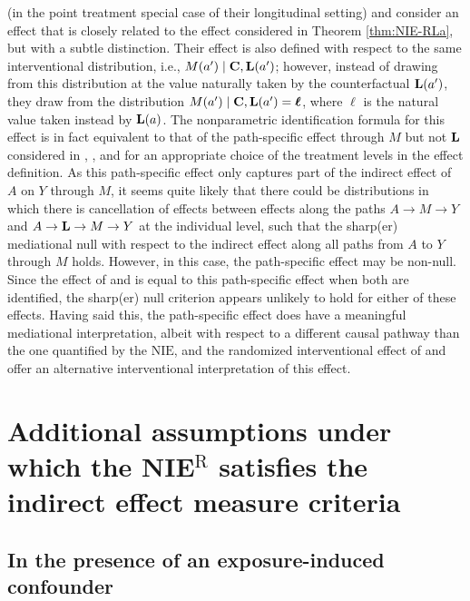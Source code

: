 \documentclass[12pt]{article}
\begin{document}
\cite{zheng2017longitudinal} (in the point treatment special case of their longitudinal setting) and \cite{nguyen2022clarifying} consider an effect that is closely related to the effect considered in Theorem \ref{thm:NIE-RLa}, but with a subtle distinction.  Their effect is also defined with respect to the same interventional distribution, i.e., $M(a')\mid {\bf C, L}(a')$; however, instead of drawing from this distribution at the value naturally taken by the counterfactual ${\bf L}(a')$, they draw from the distribution $M(a')\mid {\bf C, L}(a')=\boldsymbol{\ell}$, where $\boldsymbol\ell$ is the natural value taken instead by ${\bf L}(a)$. The nonparametric identification formula for this effect is in fact equivalent to that of the path-specific effect through $M$ but not $\bf L$ considered in \cite{avin2005identifiability}, \cite{miles2017quantifying}, and \cite{miles2020semiparametric} for an appropriate choice of the treatment levels in the effect definition. As this path-specific effect only captures part of the indirect effect of $A$ on $Y$ through $M$, it seems quite likely that there could be distributions in which there is cancellation of effects between effects along the paths $A\rightarrow M\rightarrow Y$ and $A\rightarrow {\bf L} \rightarrow M\rightarrow Y$ at the individual level, such that the sharp(er) mediational null with respect to the indirect effect along all paths from $A$ to $Y$ through $M$ holds. However, in this case, the path-specific effect may be non-null. Since the effect of \cite{zheng2017longitudinal} and \cite{nguyen2022clarifying} is equal to this path-specific effect when both are identified, the sharp(er) null criterion appears unlikely to hold for either of these effects. Having said this, the path-specific effect does have a meaningful mediational interpretation, albeit with respect to a different causal pathway than the one quantified by the $\text{NIE}$, and the randomized interventional effect of \cite{zheng2017longitudinal} and \cite{nguyen2022clarifying} offer an alternative interventional interpretation of this effect.

\section{Additional assumptions under which the NIE$^{\text{R}}$ satisfies the indirect effect measure criteria}
\subsection{In the presence of an exposure-induced confounder}
\end{document}
